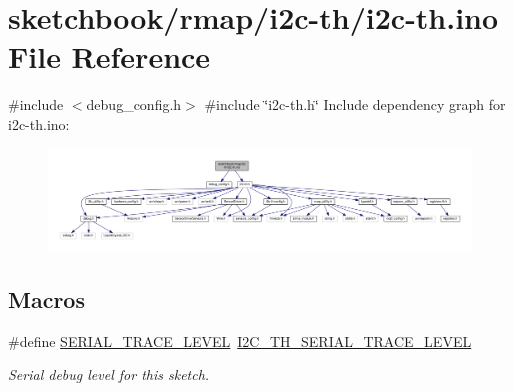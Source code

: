 \hypertarget{i2c-th_8ino}{}\section{sketchbook/rmap/i2c-\/th/i2c-\/th.ino File Reference}
\label{i2c-th_8ino}
{\ttfamily \#include $<$debug\+\_\+config.\+h$>$}\newline
{\ttfamily \#include \char`\"{}i2c-\/th.\+h\char`\"{}}\newline
Include dependency graph for i2c-\/th.ino\+:\nopagebreak
\begin{figure}[H]
\begin{center}
\leavevmode
\includegraphics[width=350pt]{i2c-th_8ino__incl}
\end{center}
\end{figure}
\subsection*{Macros}
\begin{DoxyCompactItemize}
\item 
\mbox{\label{i2c-th_8ino_a31fa5c36fa17c66feec7a67b76c3e786}} 
\#define \hyperlink{i2c-th_8ino_a31fa5c36fa17c66feec7a67b76c3e786}{S\+E\+R\+I\+A\+L\+\_\+\+T\+R\+A\+C\+E\+\_\+\+L\+E\+V\+EL}~\hyperlink{debug__config_8h_a0138759b880270bd48d1f329c5c0af4d}{I2\+C\+\_\+\+T\+H\+\_\+\+S\+E\+R\+I\+A\+L\+\_\+\+T\+R\+A\+C\+E\+\_\+\+L\+E\+V\+EL}
\begin{DoxyCompactList}\small\item\em Serial debug level for this sketch. \end{DoxyCompactList}\end{DoxyCompactItemize}
